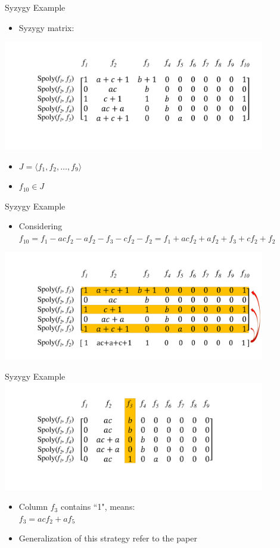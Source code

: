 \documentclass[xcolor=dvipsnames]{beamer}
\newcommand{\bi}{\begin{itemize}}
\newcommand{\ei}{\end{itemize}}
\begin{document}
\begin{frame}{\large{Syzygy Example}}
\bi
\item Syzygy matrix:
\ei
\includegraphics[width=4.5in]{./syzygy_1.pdf}
\pause
{}
\bi
\item $J = \langle f_1,f_2,\dots,f_9\rangle$
\item $f_{10}\in J$
\ei
\end{frame}
\begin{frame}{\large{Syzygy Example}}
\bi
\item Considering $f_{10}=f_1-acf_2-af_2-f_3-cf_2-f_2 = f_1+acf_2+af_2+f_3+cf_2+f_2$
\ei
\includegraphics[width=4.5in]{./syzygy_3.pdf}
\end{frame}
\begin{frame}{\large{Syzygy Example}}
\includegraphics[width=4.5in]{./syzygy_4.pdf}
\bi
\item Column $f_3$ contains ``1", means:\\
$f_3 = ac f_2 + a f_5$
\item Generalization of this strategy refer to the paper
\ei
\end{frame}
\end{document}
